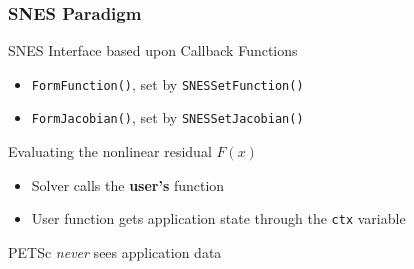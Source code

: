 \begin{frame}[fragile]
\frametitle{SNES Paradigm}

\begin{block}{SNES Interface based upon Callback Functions}
\begin{itemize}
  \item \lstinline|FormFunction()|, set by \lstinline|SNESSetFunction()|
  \item \lstinline|FormJacobian()|, set by \lstinline|SNESSetJacobian()|
\end{itemize}
\end{block}

 \begin{block}{Evaluating the nonlinear residual $F(x)$}
\begin{itemize}
  \item Solver calls the \textbf{user's} function

  \medskip

  \item User function gets application state through the \lstinline|ctx| variable
\end{itemize}
 \end{block}

   \begin{center}
    \color{red} PETSc \emph{never} sees application data
  \end{center}

\end{frame}
